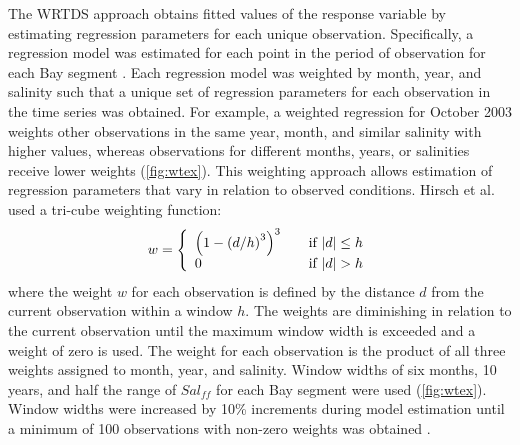\documentclass{svjour3}\usepackage[]{graphicx}\usepackage[]{color}
\begin{document}
The \ac{WRTDS} approach obtains fitted values of the response variable by estimating regression parameters for each unique observation.  Specifically, a regression model was estimated for each point in the period of observation for each Bay segment \cite{Hirsch10}. Each regression model was weighted by month, year, and salinity such that a unique set of regression parameters for each observation in the time series was obtained. For example, a weighted regression for October 2003 weights other observations in the same year, month, and similar salinity with higher values, whereas observations for different months, years, or salinities receive lower weights (\cref{fig:wtex}).  This weighting approach allows estimation of regression parameters that vary in relation to observed conditions.  Hirsch et al. \cite{Hirsch10} used a tri-cube weighting function:
\begin{equation}
w= \left\{ 
  \begin{array}{l l}
    \left(1-\left(d/h\right)^3\right)^3 & \quad \textrm{if } |d| \leq h \\
    0 & \quad \textrm{if } |d| > h 
  \end{array} \right.
\end{equation}
\noindent where the weight $w$ for each observation is defined by the distance $d$ from the current observation within a window $h$. The weights are diminishing in relation to the current observation until the maximum window width is exceeded and a weight of zero is used.  The weight for each observation is the product of all three weights assigned to month, year, and salinity.  Window widths of six months, 10 years, and half the range of $Sal_{ff}$ for each Bay segment were used (\cref{fig:wtex}).  Window widths were increased by 10\% increments during model estimation until a minimum of 100 observations with non-zero weights was obtained \cite{Hirsch10}.
\end{document}
